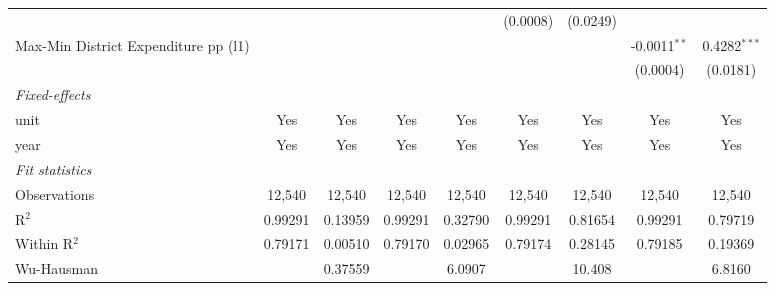 \documentclass[
  10pt,
]{article}
\begin{document}
\begin{table}[htbp]
\begin{adjustbox}{max width=\linewidth}
\begin{tabular}{lcccccccc}
                                                        &                     &                         &                     &                                 & (0.0008)            & (0.0249)                        &                     &   \\   
         Max-Min District Expenditure pp (l1)           &                     &                         &                     &                                 &                     &                                 & -0.0011$^{**}$      & 0.4282$^{***}$\\   
                                                        &                     &                         &                     &                                 &                     &                                 & (0.0004)            & (0.0181)\\   
         \midrule
         \emph{Fixed-effects}\\
         unit                                           & Yes                 & Yes                     & Yes                 & Yes                             & Yes                 & Yes                             & Yes                 & Yes\\  
         year                                           & Yes                 & Yes                     & Yes                 & Yes                             & Yes                 & Yes                             & Yes                 & Yes\\  
         \midrule
         \emph{Fit statistics}\\
         Observations                                   & 12,540              & 12,540                  & 12,540              & 12,540                          & 12,540              & 12,540                          & 12,540              & 12,540\\  
         R$^2$                                          & 0.99291             & 0.13959                 & 0.99291             & 0.32790                         & 0.99291             & 0.81654                         & 0.99291             & 0.79719\\  
         Within R$^2$                                   & 0.79171             & 0.00510                 & 0.79170             & 0.02965                         & 0.79174             & 0.28145                         & 0.79185             & 0.19369\\  
         Wu-Hausman                                     &                     & 0.37559                 &                     & 6.0907                          &                     & 10.408                          &                     & 6.8160\\  

\end{tabular}
\end{adjustbox}
\end{table}
\end{document}
